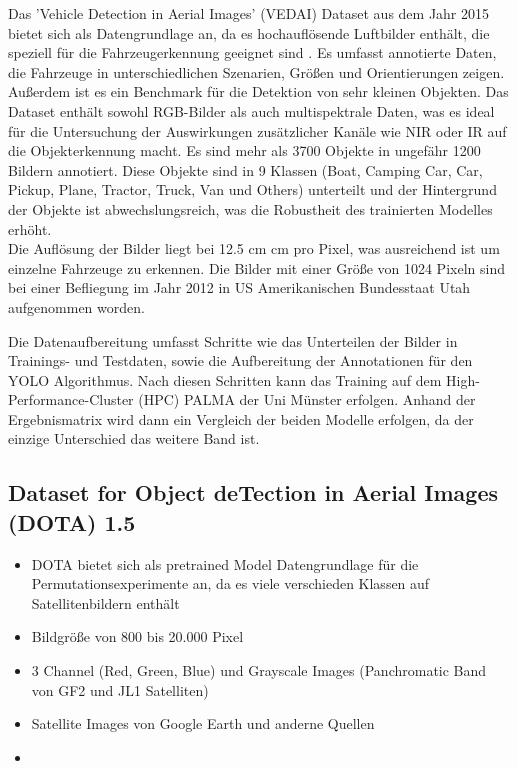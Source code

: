 Das 'Vehicle Detection in Aerial Images' (VEDAI) Dataset \cite{vedai_web}  aus dem Jahr 2015 bietet sich als Datengrundlage an, da es hochauflösende Luftbilder enthält, die speziell für die Fahrzeugerkennung geeignet sind \cite{Razakarivony2015}. Es umfasst annotierte Daten, die Fahrzeuge in unterschiedlichen Szenarien, Größen und Orientierungen zeigen. Außerdem ist es ein Benchmark für die Detektion von sehr kleinen Objekten. Das Dataset enthält sowohl RGB-Bilder als auch multispektrale Daten, was es ideal für die Untersuchung der Auswirkungen zusätzlicher Kanäle wie NIR oder IR auf die Objekterkennung macht. Es sind mehr als 3700 Objekte in ungefähr 1200 Bildern annotiert. Diese Objekte sind in 9 Klassen (Boat, Camping Car, Car, Pickup, Plane, Tractor, Truck, Van und Others) unterteilt und der Hintergrund der Objekte ist abwechslungsreich, was die Robustheit des trainierten Modelles erhöht. \\
Die Auflösung der Bilder liegt bei 12.5 cm  cm pro Pixel, was ausreichend ist um einzelne Fahrzeuge zu erkennen. Die Bilder mit einer Größe von 1024  Pixeln sind bei einer Befliegung im Jahr 2012 in US Amerikanischen Bundesstaat Utah aufgenommen worden. 

Die Datenaufbereitung umfasst Schritte wie das Unterteilen der Bilder in Trainings- und Testdaten, sowie die Aufbereitung der Annotationen für den YOLO Algorithmus. Nach diesen Schritten kann das Training auf dem High-Performance-Cluster (HPC) PALMA der Uni Münster erfolgen. Anhand der Ergebnismatrix wird dann ein Vergleich der beiden Modelle erfolgen, da der einzige Unterschied das weitere Band ist. 

\subsection{Dataset for Object deTection in Aerial Images (DOTA) 1.5}
\begin{itemize}
    \item DOTA bietet sich als pretrained Model Datengrundlage für die Permutationsexperimente an, da es viele verschieden Klassen auf Satellitenbildern enthält
    \item Bildgröße von 800  bis 20.000  Pixel
    \item 3 Channel (Red, Green, Blue) und Grayscale Images (Panchromatic Band von GF2 und JL1 Satelliten)
    \item Satellite Images von Google Earth und anderne Quellen
    \item {}
\end{itemize}


